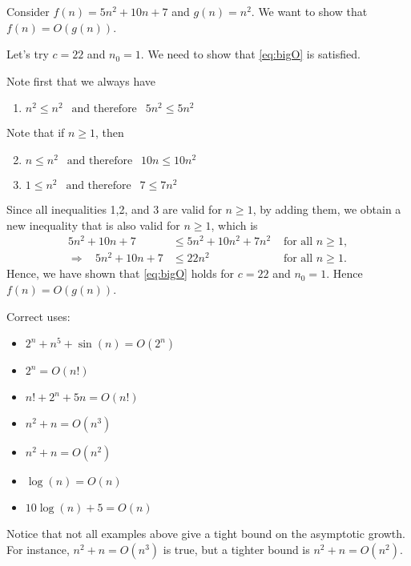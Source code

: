 \begin{example}
\label{ex:bigO}
Consider $f(n) = 5 n^2 + 10n + 7$ and $g(n) = n^2$.  We want to show that $f(n) = O(g(n))$.  

Let's try $c = 22$ and $n_0 = 1$.  We need to show that \autoref{eq:bigO} is satisfied.

Note first that we always have
\begin{enumerate}
\item $n^2 \leq n^2 \ \ \text{ and therefore } \ \ 5n^2 \leq 5n^2$
\end{enumerate}
Note that if $n \geq 1$, then 
\begin{enumerate}
\setcounter{enumi}{1}
\item $n \leq n^2 \ \ \text{ and therefore } \ \ 10n \leq 10 n^2$
\item $1 \leq n^2 \ \ \text{ and therefore } \ \  7 \leq 7 n^2$
\end{enumerate}
Since all inequalities 1,2, and 3 are valid for $n\geq 1$, by adding them, we obtain a new inequality that is also valid for $n \geq 1$, which is
\begin{align}
5n^2 + 10n + 7 &\leq 5n^2 + 10n^2 + 7 n^2 & \text{ for all } n \geq 1,\\
\Rightarrow \ \ \ \  5n^2 + 10n + 7  & \leq 22 n^2 & \text{ for all } n \geq 1.
\end{align}
Hence, we have shown that \autoref{eq:bigO} holds for $c = 22$ and $n_0 = 1$.  Hence $f(n) = O(g(n))$.
\end{example}



Correct uses:
\begin{itemize}
\item $2^n + n^5 + \sin(n) = O(2^n)$
\item $2^n = O(n!)$
\item $n! + 2^n + 5n = O(n!)$
\item $n^2 + n = O(n^3)$
\item $n^2 + n = O(n^2)$
\item $\log(n) = O(n)$
\item $10 \log(n) + 5 = O(n)$
\end{itemize}
Notice that not all examples above give a tight bound on the asymptotic growth.  For instance, $n^2 + n = O(n^3)$ is true, but a tighter bound is $n^2 + n = O(n^2)$.  

